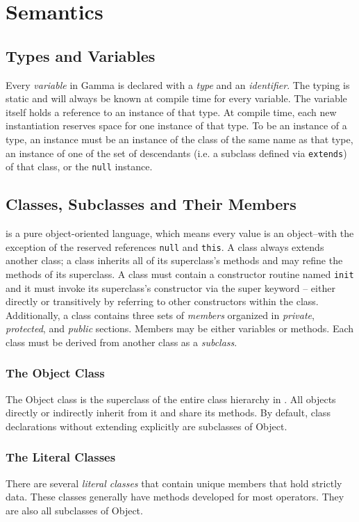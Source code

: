 \section{Semantics}
\subsection{Types and Variables}
Every \textit{variable} in Gamma is declared with a \textit{type} and an \textit{identifier}. The typing is static and will always be known at compile time for every variable. The variable itself holds a reference to an instance of that type. At compile time, each new instantiation reserves space for one instance of that type. To be an instance of a type, an instance must be an instance of the class of the same name as that type, an instance of one of the set of descendants (i.e. a subclass defined via \verb!extends!) of that class, or the {\tt null} instance.

\subsection{Classes, Subclasses and Their Members}
\Lang{} is a pure object-oriented language, which means every value is an object--with the exception of the reserved references \verb!null! and \verb!this!. A class always extends another class; a class inherits all of its superclass's methods and may refine the methods of its superclass. A class must contain a constructor routine named {\tt init} and it must invoke its superclass's constructor via the super keyword -- either directly or transitively by referring to other constructors within the class. Additionally, a class contains three sets of \textit{members} organized in \textit{private}, \textit{protected}, and \textit{public} sections. Members may be either variables or methods. Each class must be derived from another class as a \textit{subclass}.

\subsubsection{The Object Class}
The Object class is the superclass of the entire class hierarchy in \Lang{}. All objects directly or indirectly inherit from it and share its methods. By default, class declarations without extending explicitly are subclasses of Object.

\subsubsection{The Literal Classes}
There are several \textit{literal classes} that contain unique members that hold strictly data. These classes generally have methods developed for most operators. They are also all subclasses of Object.


